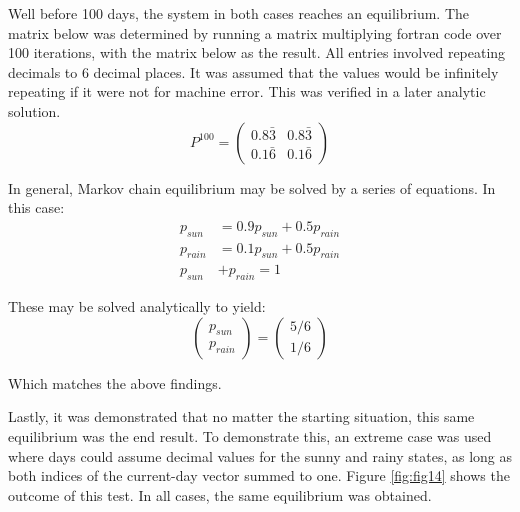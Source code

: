 \documentclass[twocolumn]{article}
\begin{document}
Well before 100 days, the system in both cases reaches an equilibrium. The matrix below was determined by running a matrix multiplying fortran code over 100 iterations, with the matrix below as the result. All entries involved repeating decimals to 6 decimal places. It was assumed that the values would be infinitely repeating if it were not for machine error. This was verified in a later analytic solution.
\[ P^{100} = \begin{pmatrix}
0.8\bar{3} & 0.8\bar{3} \\
0.1\bar{6} & 0.1\bar{6}
\end{pmatrix} \]

In general, Markov chain equilibrium may be solved by a series of equations. In this case:
\begin{equation}
\begin{split}
p_{sun} &= 0.9 p_{sun} + 0.5 p_{rain} \\
p_{rain} &= 0.1 p_{sun} + 0.5 p_{rain} \\
p_{sun} &+ p_{rain} = 1
\end{split}
\end{equation}

These may be solved analytically to yield:
\begin{equation}
\begin{pmatrix} p_{sun} \\ p_{rain} \end{pmatrix}
= \begin{pmatrix} 5/6 \\ 1/6 \end{pmatrix}
\end{equation}

Which matches the above findings.

Lastly, it was demonstrated that no matter the starting situation, this same equilibrium was the end result. To demonstrate this, an extreme case was used where days could assume decimal values for the sunny and rainy states, as long as both indices of the current-day vector summed to one. Figure \ref{fig:fig14} shows the outcome of this test. In all cases, the same equilibrium was obtained.
\end{document}
